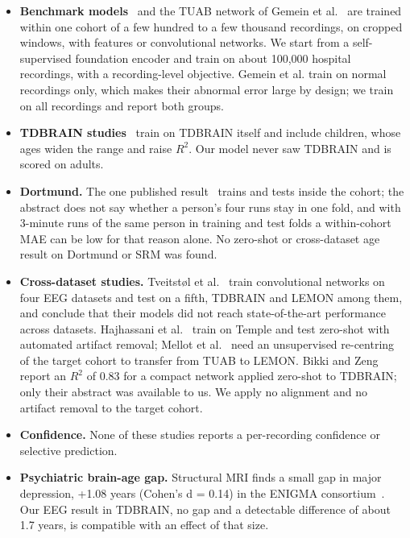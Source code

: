 \documentclass[11pt,a4paper]{article}
\begin{document}
\begin{itemize}
\item \textbf{Benchmark models}~\citep{engemann2022benchmark} and the TUAB network of Gemein et al.~\citep{gemein2024revisited} are trained within one cohort of a few hundred to a few thousand recordings, on cropped windows, with features or convolutional networks. We start from a self-supervised foundation encoder and train on about 100,000 hospital recordings, with a recording-level objective. Gemein et al. train on normal recordings only, which makes their abnormal error large by design; we train on all recordings and report both groups.
\item \textbf{TDBRAIN studies}~\citep{khayretdinova2022tdbrain,hu2025neoba,bomatter2024biomarkers} train on TDBRAIN itself and include children, whose ages widen the range and raise $R^2$. Our model never saw TDBRAIN and is scored on adults.
\item \textbf{Dortmund.} The one published result~\citep{azami2025dortmund} trains and tests inside the cohort; the abstract does not say whether a person's four runs stay in one fold, and with 3-minute runs of the same person in training and test folds a within-cohort MAE can be low for that reason alone. No zero-shot or cross-dataset age result on Dortmund or SRM was found.
\item \textbf{Cross-dataset studies.} Tveitstøl et al.~\citep{tveitstol2026robustness} train convolutional networks on four EEG datasets and test on a fifth, TDBRAIN and LEMON among them, and conclude that their models did not reach state-of-the-art performance across datasets. Hajhassani et al.~\citep{hajhassani2026artifact} train on Temple and test zero-shot with automated artifact removal; Mellot et al.~\citep{mellot2023harmonizing} need an unsupervised re-centring of the target cohort to transfer from TUAB to LEMON. Bikki and Zeng~\citep{bikki2026crossdataset} report an $R^2$ of 0.83 for a compact network applied zero-shot to TDBRAIN; only their abstract was available to us. We apply no alignment and no artifact removal to the target cohort.
\item \textbf{Confidence.} None of these studies reports a per-recording confidence or selective prediction.
\item \textbf{Psychiatric brain-age gap.} Structural MRI finds a small gap in major depression, +1.08 years (Cohen's d = 0.14) in the ENIGMA consortium~\citep{han2021enigma}. Our EEG result in TDBRAIN, no gap and a detectable difference of about 1.7 years, is compatible with an effect of that size.
\end{itemize}
\end{document}
